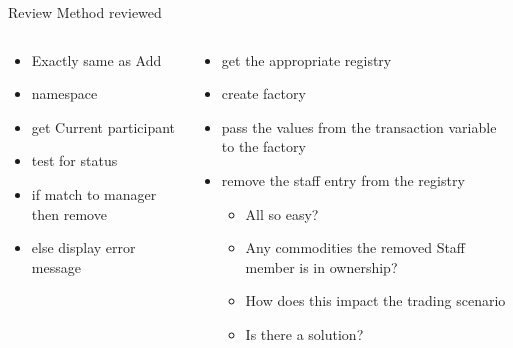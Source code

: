 \documentclass[pdf,table]{beamer}
\begin{document}
\begin{frame}{Review Method reviewed}
	\begin{columns}[T]
		\begin{column}{0.48\textwidth}
			\begin{itemize}
				\item Exactly same as Add
				\item namespace
				\item get Current participant
				\item test for status
				\item if match to manager then remove
				\item else display error message
		\end{itemize}
		\end{column}
		\begin{column}{0.48\textwidth}
			\begin{itemize}
				\item get the appropriate registry
				\item create factory
				\item pass the values from the transaction variable to the factory
				\item remove the staff entry from the registry
					\begin{itemize}
						\item All so easy?
						\item <2-> Any commodities the removed Staff member is in ownership?
						\item <2-> How does this impact the trading scenario
						\item <2-> Is there a solution?
					\end{itemize}
		\end{itemize}
		\end{column}
	\end{columns}	
\end{frame}






\end{document}
